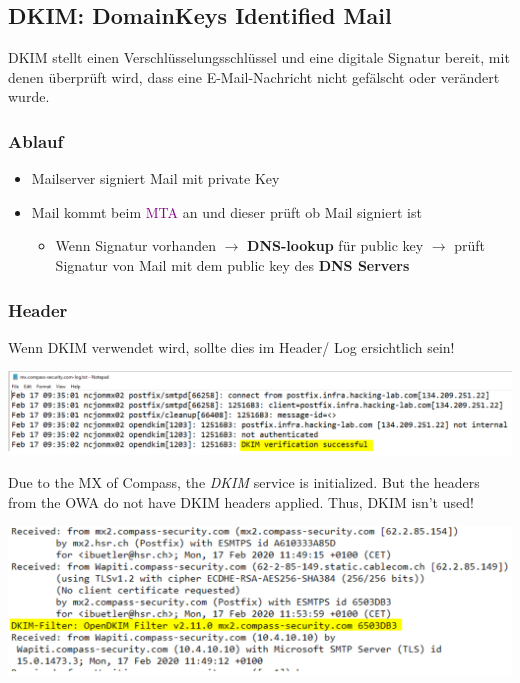 \subsection{DKIM: DomainKeys Identified Mail}
DKIM stellt einen Verschlüsselungsschlüssel und eine digitale Signatur bereit, mit denen überprüft wird, dass eine E-Mail-Nachricht nicht gefälscht oder verändert wurde.

\subsubsection{Ablauf}
\begin{itemize}
    \item Mailserver signiert Mail mit private Key
    \item Mail kommt beim  \textcolor{purple}{MTA} an und dieser prüft ob Mail signiert ist
    \begin{itemize}
        \item Wenn Signatur vorhanden $\rightarrow$ \textbf{DNS-lookup} für public key $\rightarrow$ prüft Signatur von Mail mit dem public key des \textbf{DNS Servers}\\
    \end{itemize}
\end{itemize}

\subsubsection{Header}
Wenn DKIM verwendet wird, sollte dies im Header/ Log ersichtlich sein!
\begin{center}
    \vspace{-8pt}
    \includegraphics[width=1.0\linewidth]{./img/07-mail_security/dkim}
    \vspace{-8pt}
\end{center}
Due to the MX of Compass, the \textit{DKIM} service is initialized. But the headers from the OWA do not have DKIM headers applied. Thus, DKIM isn't used!
\begin{center}
    \vspace{-8pt}
    \includegraphics[width=.8\linewidth]{./img/07-mail_security/dkim2}
    \vspace{-8pt}
\end{center}

